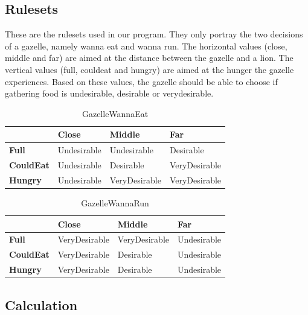 \documentclass[11pt]{extarticle}
\begin{document}
    \subsection{Rulesets}
    These are the rulesets used in our program.
    They only portray the two decisions of a gazelle, namely wanna eat and wanna run.
    The horizontal values (close, middle and far) are aimed at the distance between the gazelle and a lion.
    The vertical values (full, couldeat and hungry) are aimed at the hunger the gazelle experiences.
    Based on these values, the gazelle should be able to choose if gathering food is undesirable, desirable or verydesirable.
    \begin{table}[ht]
        \centering
        \label{my-label}
        \begin{tabular}{|l|l|l|l|}
            \hline
            & \textbf{Close}       & \textbf{Middle}        & \textbf{Far}           \\ \hline
            \textbf{Full}     & Undesirable & Undesirable   & Desirable     \\ \hline
            \textbf{CouldEat} & Undesirable & Desirable     & VeryDesirable \\ \hline
            \textbf{Hungry}   & Undesirable & VeryDesirable & VeryDesirable \\ \hline
        \end{tabular}
        \caption{GazelleWannaEat}
    \end{table}

    \begin{table}[ht]
        \centering
        \label{my-label2}
        \begin{tabular}{|l|l|l|l|}
            \hline
            & \textbf{Close}       & \textbf{Middle}        & \textbf{Far}           \\ \hline
            \textbf{Full}     & VeryDesirable & VeryDesirable   & Undesirable     \\ \hline
            \textbf{CouldEat} & VeryDesirable & Desirable     & Undesirable \\ \hline
            \textbf{Hungry}   & VeryDesirable & Desirable & Undesirable \\ \hline
        \end{tabular}
        \caption{GazelleWannaRun}
    \end{table}
    
    \subsection{Calculation}
\end{document}
